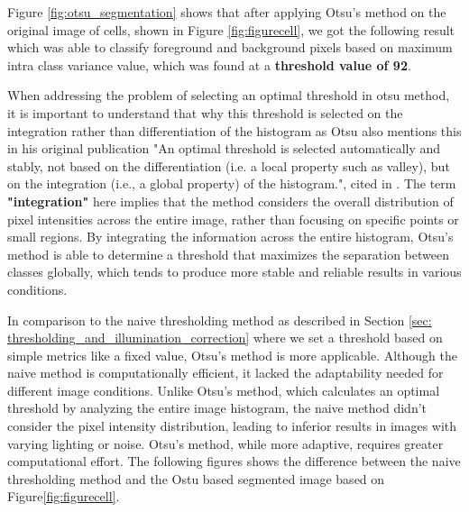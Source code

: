 \documentclass[%
	a4paper, %
	12pt, %
	english, %
	bibtotoc %
]{scrartcl}
\begin{document}
Figure \ref{fig:otsu_segmentation} shows that after applying Otsu's method on the original image of cells, shown in Figure \ref{fig:figurecell}, we got the following result which was able to classify foreground and background pixels based on maximum intra class variance value, which was found at a \textbf{threshold value of 92}.

When addressing the problem of selecting an optimal threshold in otsu method, it is important to understand that why this threshold is selected on the integration rather than differentiation of the histogram as Otsu also mentions this in his original publication "An optimal threshold is selected automatically and stably, not based on the differentiation (i.e. a local property such as valley), but on the integration (i.e., a global property) of the histogram.", cited in \cite{otsu}. The term \textbf{"integration"} here implies that the method considers the overall distribution of pixel intensities across the entire image, rather than focusing on specific points or small regions. By integrating the information across the entire histogram, Otsu's method is able to determine a threshold that maximizes the separation between classes globally, which tends to produce more stable and reliable results in various conditions. 

 In comparison to the naive thresholding method as described in Section \ref{sec: thresholding_and_illumination_correction} where we set a threshold based on simple metrics like a fixed value, Otsu's method is more applicable. Although the naive method is computationally efficient, it lacked the adaptability needed for different image conditions. Unlike Otsu's method, which calculates an optimal threshold by analyzing the entire image histogram, the naive method didn't consider the pixel intensity distribution, leading to inferior results in images with varying lighting or noise. Otsu’s method, while more adaptive, requires greater computational effort. The following figures shows the difference between the naive thresholding method and the Ostu based segmented image based on Figure\ref{fig:figurecell}.
\end{document}
